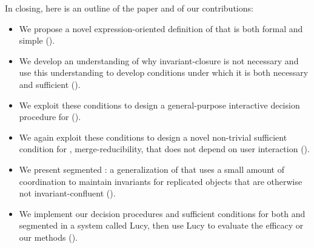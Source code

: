 In closing, here is an outline of the paper and of our contributions:
\begin{itemize}
  \item
    We propose a novel expression-oriented definition of \invariantconfluence{}
    that is both formal and simple ().

  \item
    We develop an understanding of why invariant-closure is not necessary and
    use this understanding to develop conditions under which it is both
    necessary and sufficient ().

  \item
    We exploit these conditions to design a general-purpose interactive
    decision procedure for \invariantconfluence{}
    ().

  \item
    We again exploit these conditions to design a novel non-trivial sufficient
    condition for \invariantconfluence{}, merge-reducibility, that does not
    depend on user interaction ().

  \item
    We present segmented \invariantconfluence{}: a generalization of
    \invariantconfluence{} that uses a small amount of coordination to maintain
    invariants for replicated objects that are otherwise not
    invariant-confluent ().

  \item
    We implement our decision procedures and sufficient conditions for both
    \invariantconfluence{} and segmented \invariantconfluence{} in a system called
    Lucy, then use Lucy to evaluate the efficacy or our methods
    ().
\end{itemize}
